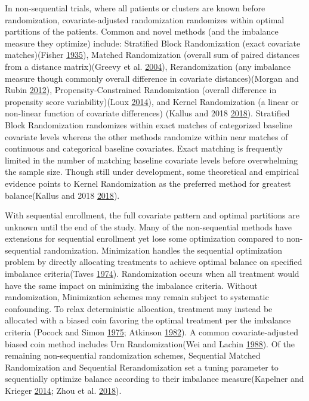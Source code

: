 \documentclass[12pt,oneside]{book}
\newlength{\li}\setlength{\li}{14.48pt}
\newlength{\di}\setlength{\di}{-3.5mm}
\theoremstyle{definition}
\theoremstyle{definition}
\theoremstyle{definition}
\theoremstyle{remark}
\begin{document}
In non-sequential trials, where all patients or clusters are known
before randomization, covariate-adjusted randomization randomizes within
optimal partitions of the patients. Common and novel methods (and the
imbalance measure they optimize) include: Stratified Block Randomization
(exact covariate matches)(Fisher
\protect\hyperlink{ref-fisher1935design}{1935}), Matched Randomization
(overall sum of paired distances from a distance matrix)(Greevy et al.
\protect\hyperlink{ref-Greevy:2004ke}{2004}), Rerandomization (any
imbalance measure though commonly overall difference in covariate
distances)(Morgan and Rubin
\protect\hyperlink{ref-Morgan:2012iq}{2012}), Propensity-Constrained
Randomization (overall difference in propensity score variability)(Loux
\protect\hyperlink{ref-Loux:2014bu}{2014}), and Kernel Randomization (a
linear or non-linear function of covariate differences) (Kallus and 2018
\protect\hyperlink{ref-Kallus:2018um}{2018}). Stratified Block
Randomization randomizes within exact matches of categorized baseline
covariate levels whereas the other methods randomize within near matches
of continuous and categorical baseline covariates. Exact matching is
frequently limited in the number of matching baseline covariate levels
before overwhelming the sample size. Though still under development,
some theoretical and empirical evidence points to Kernel Randomization
as the preferred method for greatest balance(Kallus and 2018
\protect\hyperlink{ref-Kallus:2018um}{2018}).

With sequential enrollment, the full covariate pattern and optimal
partitions are unknown until the end of the study. Many of the
non-sequential methods have extensions for sequential enrollment yet
lose some optimization compared to non-sequential randomization.
Minimization handles the sequential optimization problem by directly
allocating treatments to achieve optimal balance on specified imbalance
criteria(Taves \protect\hyperlink{ref-Taves:1974hn}{1974}).
Randomization occurs when all treatment would have the same impact on
minimizing the imbalance criteria. Without randomization, Minimization
schemes may remain subject to systematic confounding. To relax
deterministic allocation, treatment may instead be allocated with a
biased coin favoring the optimal treatment per the imbalance criteria
(Pocock and Simon \protect\hyperlink{ref-Pocock:1975wd}{1975}; Atkinson
\protect\hyperlink{ref-Atkinson:1982kt}{1982}). A common
covariate-adjusted biased coin method includes Urn Randomization(Wei and
Lachin \protect\hyperlink{ref-Wei:1988if}{1988}). Of the remaining
non-sequential randomization schemes, Sequential Matched Randomization
and Sequential Rerandomization set a tuning parameter to sequentially
optimize balance according to their imbalance measure(Kapelner and
Krieger \protect\hyperlink{ref-Kapelner:2014cu}{2014}; Zhou et al.
\protect\hyperlink{ref-Quan:SeqRerand}{2018}).
\end{document}
